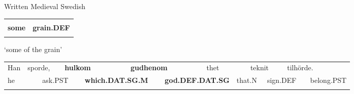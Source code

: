 
\begin{listWWNumileveli}
\item {}

\begin{styleExample}
Written Medieval Swedish

\end{styleExample}

\end{listWWNumileveli}

\begin{listWWNumxlleveli}
\item {}

\end{listWWNumxlleveli}

\begin{tabular}{ll}
\lsptoprule
\multicolumn{2}{l}{{\bfseries somlikin}

}\\
{\bfseries some} & {\bfseries grain.DEF}\\
\lspbottomrule
\end{tabular}

\begin{styleTranslation}
‘some of the grain’

\end{styleTranslation}

\begin{tabular}{llllllllllllll}
\lsptoprule
Han & \multicolumn{2}{l}{sporde,

} & \multicolumn{2}{l}{{\bfseries hulkom}

} & \multicolumn{2}{l}{{\bfseries gudhenom}

} & \multicolumn{2}{l}{thet

} & \multicolumn{2}{l}{teknit

} & \multicolumn{2}{l}{tilhörde.

} & \\
\multicolumn{2}{l}{he

} & \multicolumn{2}{l}{ask.PST

} & \multicolumn{2}{l}{{\bfseries which.DAT.SG.M}

} & \multicolumn{2}{l}{{\bfseries god.DEF.DAT.SG}

} & \multicolumn{2}{l}{that.N

} & \multicolumn{2}{l}{sign.DEF

} & \multicolumn{2}{l}{belong.PST

}\\
\lspbottomrule
\end{tabular}


